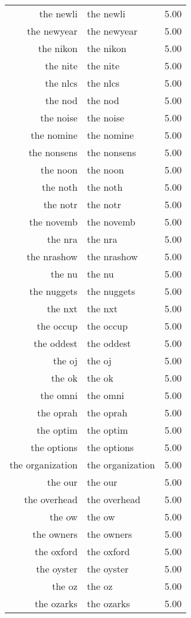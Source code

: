 \begin{table}[ht]
\begin{tabular}{rlr}
  the newli & the newli & 5.00 \\ 
  the newyear & the newyear & 5.00 \\ 
  the nikon & the nikon & 5.00 \\ 
  the nite & the nite & 5.00 \\ 
  the nlcs & the nlcs & 5.00 \\ 
  the nod & the nod & 5.00 \\ 
  the noise & the noise & 5.00 \\ 
  the nomine & the nomine & 5.00 \\ 
  the nonsens & the nonsens & 5.00 \\ 
  the noon & the noon & 5.00 \\ 
  the noth & the noth & 5.00 \\ 
  the notr & the notr & 5.00 \\ 
  the novemb & the novemb & 5.00 \\ 
  the nra & the nra & 5.00 \\ 
  the nrashow & the nrashow & 5.00 \\ 
  the nu & the nu & 5.00 \\ 
  the nuggets & the nuggets & 5.00 \\ 
  the nxt & the nxt & 5.00 \\ 
  the occup & the occup & 5.00 \\ 
  the oddest & the oddest & 5.00 \\ 
  the oj & the oj & 5.00 \\ 
  the ok & the ok & 5.00 \\ 
  the omni & the omni & 5.00 \\ 
  the oprah & the oprah & 5.00 \\ 
  the optim & the optim & 5.00 \\ 
  the options & the options & 5.00 \\ 
  the organization & the organization & 5.00 \\ 
  the our & the our & 5.00 \\ 
  the overhead & the overhead & 5.00 \\ 
  the ow & the ow & 5.00 \\ 
  the owners & the owners & 5.00 \\ 
  the oxford & the oxford & 5.00 \\ 
  the oyster & the oyster & 5.00 \\ 
  the oz & the oz & 5.00 \\ 
  the ozarks & the ozarks & 5.00 \\ 

\end{tabular}
\end{table}
